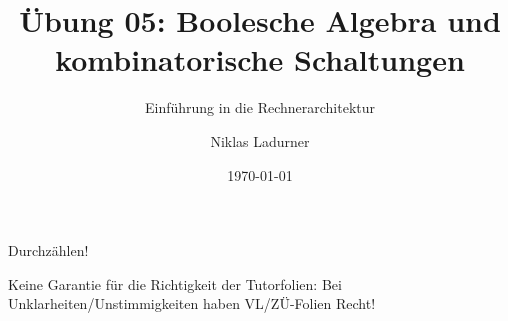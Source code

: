 \documentclass[
  german,            %
  aspectratio=169,    %
]{tumbeamer}
\title{Übung 05: Boolesche Algebra und \\kombinatorische Schaltungen}
\subtitle{Einführung in die Rechnerarchitektur}
\author{Niklas Ladurner}
\institute{\theChairName\\\theDepartmentName\\\theUniversityName}
\date[\today]{\today}
\begin{document}
\maketitle

\begin{frame}[c]{}{}
  \begin{center}
    \LARGE  Durchzählen!
  \end{center}
\end{frame}

\begin{frame}[c]{}{}
  \begin{center}
    \LARGE  Keine Garantie für die Richtigkeit der Tutorfolien: Bei Unklarheiten/Unstimmigkeiten
    haben VL/ZÜ-Folien Recht!
  \end{center}
\end{frame}
\end{document}
